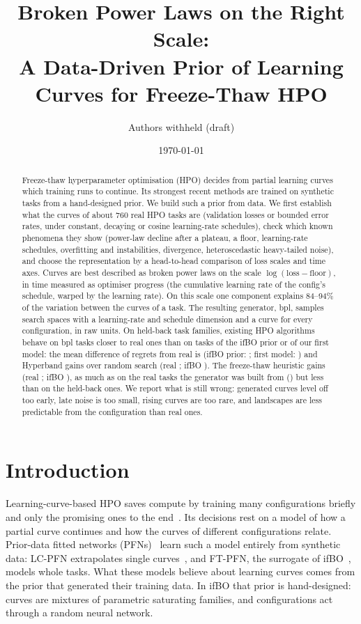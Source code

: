 \documentclass[10pt]{article}
\title{Broken Power Laws on the Right Scale:\\A Data-Driven Prior of Learning Curves for Freeze-Thaw HPO}
\author{Authors withheld (draft)}
\date{\today}
\newcommand{\bpl}{\textsf{bpl}}
\begin{document}
\maketitle

\begin{abstract}
Freeze-thaw hyperparameter optimisation (HPO) decides from partial learning curves which training runs to
continue. Its strongest recent methods are trained on synthetic tasks from a hand-designed prior. We build such a
prior from data. We first establish what the curves of about 760 real HPO tasks are (validation losses or bounded
error rates, under constant, decaying or cosine learning-rate schedules), check which known phenomena they show
(power-law decline after a plateau, a floor, learning-rate schedules, overfitting and instabilities, divergence,
heteroscedastic heavy-tailed noise), and choose the representation by a head-to-head comparison of loss scales and
time axes. Curves are best described as broken power laws on the scale $\log(\text{loss} - \text{floor})$, in
time measured as optimiser progress (the cumulative learning rate of the config's schedule, warped by the learning
rate). On this scale one component explains 84--94\% of the variation between the curves of a task. The resulting
generator, \bpl{}, samples search spaces with a learning-rate and schedule dimension and a curve for every
configuration, in raw units. On held-back task families, existing HPO algorithms behave on \bpl{} tasks closer to real ones than on tasks of the
ifBO prior or of our first model: the mean difference of regrets from real is \bplMAE{} (ifBO prior: \ifboMAE{};
first model: \swtMAE{}) and Hyperband gains \bplHB{} over random search (real \realHB{}; ifBO \ifboHB{}). The
freeze-thaw heuristic gains \bplFT{} (real \realFT{}; ifBO \ifboFT{}), as much as on the real tasks the generator
was built from (\fitFT{}) but less than on the held-back ones. We report what is still wrong: generated curves level off too early, late noise is too small, rising
curves are too rare, and landscapes are less predictable from the configuration than real ones.
\end{abstract}

\section{Introduction}

Learning-curve-based HPO saves compute by training many configurations briefly and only the promising ones to
the end~\cite{swersky2014freeze,li2018hyperband,wistuba2022supervising}. Its decisions rest on a model of how a
partial curve continues and how the curves of different configurations relate. Prior-data fitted networks
(PFNs)~\cite{muller2022transformers} learn such a model entirely from synthetic data: LC-PFN extrapolates single
curves~\cite{adriaensen2023efficient}, and FT-PFN, the surrogate of ifBO~\cite{rakotoarison2024incontext}, models
whole tasks. What these models believe about learning curves comes from the prior that generated their training
data. In ifBO that prior is hand-designed: curves are mixtures of parametric saturating families, and
configurations act through a random neural network.
\end{document}

